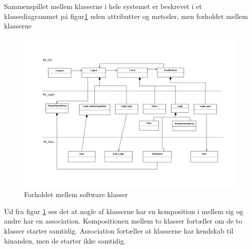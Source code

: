 Sammenspillet mellem klasserne i hele systemet er beskrevet i et klassediagrammet på figur\ref{komposition}  uden attributter og metoder, men forholdet mellem klasserne
\begin{figure}[H]
	\includegraphics[width=1\textwidth]{Figurer/Softwareimplementering/komposition}
	\caption{Forholdet mellem software klasser}
	\label{komposition}
\end{figure}
Ud fra figur \ref{komposition} ses det at nogle af klasserne har en komposition i mellem sig og andre har en association. Kompositionen mellem to klasser fortæller om de to klasser starter samtidig. Association fortæller at klasserne har kendskab til hinanden, men de starter ikke samtidig. 


